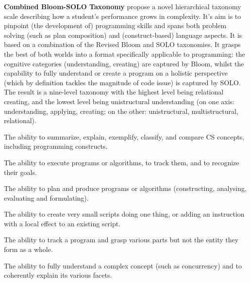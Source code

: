 \noindent \textbf{Combined Bloom-SOLO Taxonomy}\newline
{}
 propose a novel hierarchical taxonomy scale describing how a student's performance grows in complexity. It's aim is to pinpoint (the development of) programming skills and spans both problem solving (such as plan composition) and (construct-based) language aspects. It is based on a combination of the Revised Bloom and SOLO taxonomies.  It grasps the best of both worlds into a format specifically applicable to programming: the cognitive categories (understanding, creating) are captured by Bloom, whilst the capability to fully understand or create a program on a holistic perspective (which by definition tackles the magnitude of code issue) is captured by SOLO. The result is a nine-level taxonomy with the highest level being relational creating, and the lowest level being unistructural understanding (on one axis: understanding, applying, creating; on the other: unistructural, multistructural, relational).



\begin{description}[leftmargin=1em]
\item[Understanding:] The ability to summarize, explain, exemplify,
    classify, and compare CS concepts, including programming constructs.
\item[Applying:] The ability to execute programs or algorithms, to track
    them, and to recognize their goals.
\item[Creating:] The ability to plan and produce programs or algorithms
    (constructing, analysing, evaluating and formulating).
\item[Unistructural:] The ability to create very small scripts doing one
    thing, or adding an instruction with a local effect to an existing
    script.
\item[Multistructural:] The ability to track a program and grasp various
    parts but not the entity they form as a whole.
\item[Relational:] The ability to fully understand a complex concept (such
    as concurrency) and to coherently explain its various facets.
\end{description}

